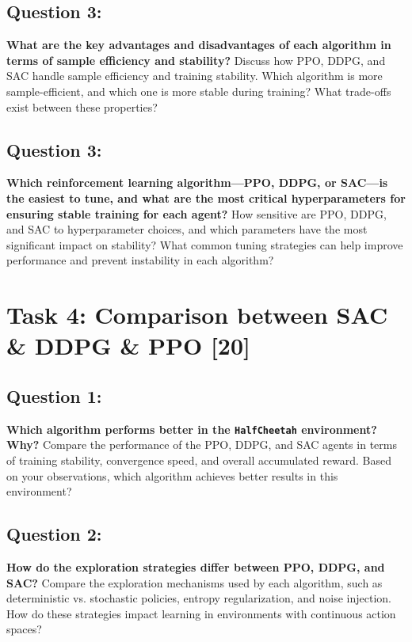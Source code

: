 \documentclass[12pt]{article}
\begin{document}
{{{\subsection{Question 3:}
\textbf{What are the key advantages and disadvantages of each algorithm in terms of sample efficiency and stability?}
\newline
Discuss how PPO, DDPG, and SAC handle sample efficiency and training stability. Which algorithm is more sample-efficient, and which one is more stable during training? What trade-offs exist between these properties?

\vspace*{0.3cm}

\subsection{Question 3:}
\textbf{Which reinforcement learning algorithm—PPO, DDPG, or SAC—is the easiest to tune, and what are the most critical hyperparameters for ensuring stable training for each agent?}
\newline
How sensitive are PPO, DDPG, and SAC to hyperparameter choices, and which parameters have the most significant impact on stability?
What common tuning strategies can help improve performance and prevent instability in each algorithm?


\newpage

\section{Task 4: Comparison between SAC \& DDPG \& PPO [20]}

\subsection{Question 1:}
\textbf{Which algorithm performs better in the \texttt{HalfCheetah} environment? Why?}
\newline
Compare the performance of the PPO, DDPG, and SAC agents in terms of training stability, convergence speed, and overall accumulated reward. Based on your observations, which algorithm achieves better results in this environment?

\subsection{Question 2:}
\textbf{How do the exploration strategies differ between PPO, DDPG, and SAC?}
\newline
Compare the exploration mechanisms used by each algorithm, such as deterministic vs. stochastic policies, entropy regularization, and noise injection. How do these strategies impact learning in environments with continuous action spaces?

}}}
\end{document}
